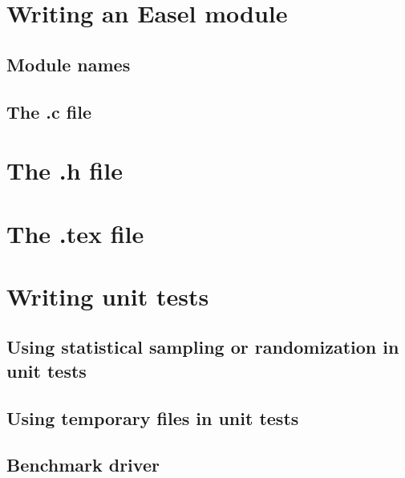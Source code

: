 \section{Writing an Easel module}

\subsection{Module names}

\subsection{The .c file}


\section{The .h file}


\section{The .tex file}


\section{Writing unit tests}

\subsection{Using statistical sampling or randomization in unit tests}

\subsection{Using temporary files in unit tests}

\subsection{Benchmark driver}

